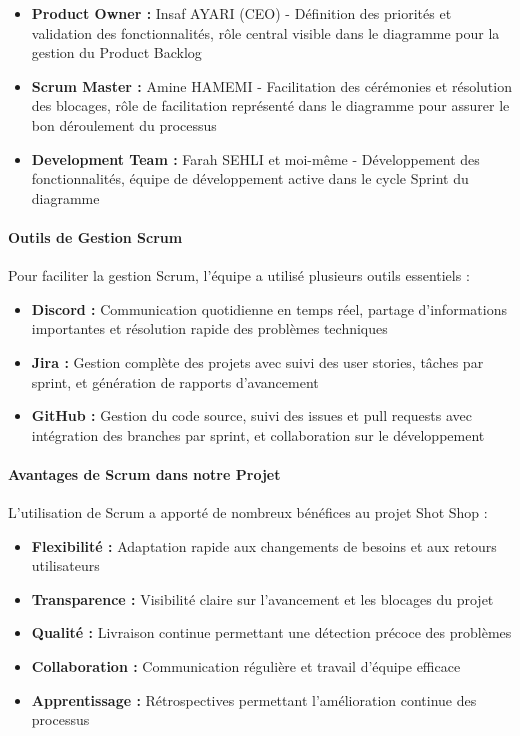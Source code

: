 \documentclass[12pt,a4paper]{article}
\begin{document}
\begin{itemize}
    \item \textbf{Product Owner :} Insaf AYARI (CEO) - Définition des priorités et validation des fonctionnalités, rôle central visible dans le diagramme pour la gestion du Product Backlog
    \item \textbf{Scrum Master :} Amine HAMEMI - Facilitation des cérémonies et résolution des blocages, rôle de facilitation représenté dans le diagramme pour assurer le bon déroulement du processus
    \item \textbf{Development Team :} Farah SEHLI et moi-même - Développement des fonctionnalités, équipe de développement active dans le cycle Sprint du diagramme
\end{itemize}

\paragraph{Outils de Gestion Scrum}
Pour faciliter la gestion Scrum, l'équipe a utilisé plusieurs outils essentiels :

\begin{itemize}
    \item \textbf{Discord :} Communication quotidienne en temps réel, partage d'informations importantes et résolution rapide des problèmes techniques
    \item \textbf{Jira :} Gestion complète des projets avec suivi des user stories, tâches par sprint, et génération de rapports d'avancement
    \item \textbf{GitHub :} Gestion du code source, suivi des issues et pull requests avec intégration des branches par sprint, et collaboration sur le développement
\end{itemize}

\paragraph{Avantages de Scrum dans notre Projet}
L'utilisation de Scrum a apporté de nombreux bénéfices au projet Shot Shop :

\begin{itemize}
    \item \textbf{Flexibilité :} Adaptation rapide aux changements de besoins et aux retours utilisateurs
    \item \textbf{Transparence :} Visibilité claire sur l'avancement et les blocages du projet
    \item \textbf{Qualité :} Livraison continue permettant une détection précoce des problèmes
    \item \textbf{Collaboration :} Communication régulière et travail d'équipe efficace
    \item \textbf{Apprentissage :} Rétrospectives permettant l'amélioration continue des processus
\end{itemize}
\end{document}
